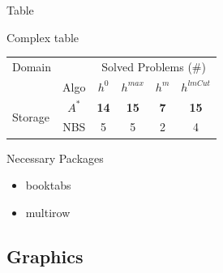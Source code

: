\documentclass[xcolor=dvipsnames]{beamer} %
\newcommand{\ra}[1]{\renewcommand{\arraystretch}{#1}} %
\begin{document}
\begin{frame}{Table}
  \begin{block}{Complex table}
    \begin{table}[H]\centering
      \ra{1.3}
      \begin{tabular}{l|c|cccc}
        \multicolumn{1}{c}{Domain}& & \multicolumn{4}{c}{Solved Problems (\#)} \\ [0.5ex]
        \cmidrule(r){3-6}
          & Algo & $h^0$ & $h^{max}$ & $h^m$ & $h^{lmCut}$ \\
        \toprule
        \multirow{2}{*}{Storage} & $A^*$ & \textbf{14} & \textbf{15} & \textbf{7} & \textbf{15} \\
          & \textsc{NBS} & 5 & 5 & 2 & 4 \\ 
        \bottomrule
      \end{tabular} 
    \end{table}
  \end{block}
  \begin{block}{Necessary Packages}
    \begin{itemize}
      \item booktabs %
      \item multirow %
    \end{itemize}
  \end{block}
\end{frame}

\subsection{Graphics}
\end{document}
